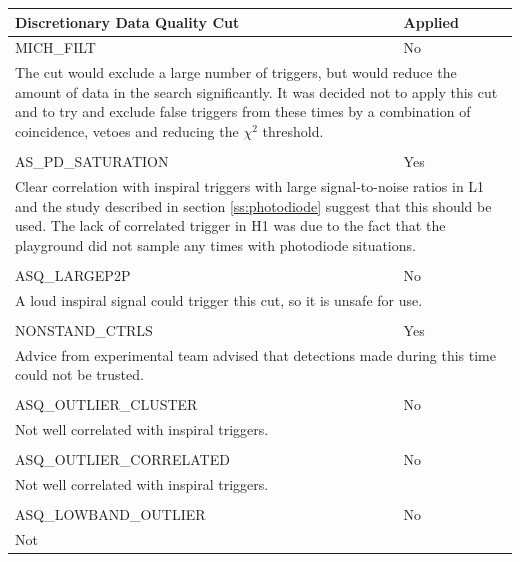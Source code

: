 \begin{table}[p]
\begin{center}
\begin{tabular}{ll}
Discretionary Data Quality Cut  & Applied \\\hline\hline
MICH\_FILT                 & No \\
\multicolumn{2}{l}{\parbox{\linewidth}{\footnotesize The cut would exclude a
large number of triggers, but would reduce the amount of data in the search
significantly. It was decided not to apply this cut and to try and exclude
false triggers from these times by a combination of coincidence, vetoes and
reducing the $\chi^2$ threshold.}}\\
\\
AS\_PD\_SATURATION        & Yes \\
\multicolumn{2}{l}{\parbox{\linewidth}{\footnotesize Clear correlation with
inspiral triggers with large signal-to-noise ratios in L1 and the study
described in section \ref{ss:photodiode} suggest that this should be used. The
lack of correlated trigger in H1 was due to the fact that the playground did
not sample any times with photodiode situations.\baselineskip=14pt}}\\
\\
ASQ\_LARGEP2P             & No \\
\multicolumn{2}{l}{\parbox{\linewidth}{\footnotesize A loud inspiral signal
could trigger this cut, so it is unsafe for use.\baselineskip=14pt}} \\
\\
NONSTAND\_CTRLS           & Yes \\
\multicolumn{2}{l}{\parbox{\linewidth}{\footnotesize Advice from experimental
team advised that detections made during this time could not be
trusted.\baselineskip=14pt}} \\
\\
ASQ\_OUTLIER\_CLUSTER     & No \\
\multicolumn{2}{l}{\parbox{\linewidth}{\footnotesize Not 
well correlated with inspiral triggers. \baselineskip=14pt}} \\
\\
ASQ\_OUTLIER\_CORRELATED  & No \\
\multicolumn{2}{l}{\parbox{\linewidth}{\footnotesize Not 
well correlated with inspiral triggers.\baselineskip=14pt}} \\
\\
ASQ\_LOWBAND\_OUTLIER     & No \\
\multicolumn{2}{l}{\parbox{\linewidth}{\footnotesize Not 
}}
\end{tabular}
\end{center}
\end{table}
